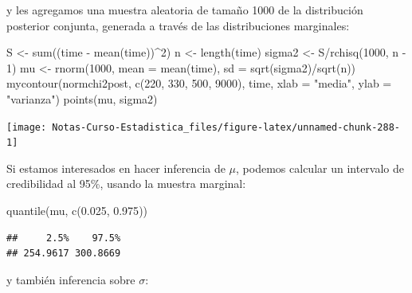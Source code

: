 \documentclass[
  12pt,
]{book}
\newenvironment{Shaded}{\begin{snugshade}}{\end{snugshade}}
\newcommand{\AttributeTok}[1]{\textcolor[rgb]{0.77,0.63,0.00}{#1}}
\newcommand{\DecValTok}[1]{\textcolor[rgb]{0.00,0.00,0.81}{#1}}
\newcommand{\FloatTok}[1]{\textcolor[rgb]{0.00,0.00,0.81}{#1}}
\newcommand{\FunctionTok}[1]{\textcolor[rgb]{0.00,0.00,0.00}{#1}}
\newcommand{\NormalTok}[1]{#1}
\newcommand{\OtherTok}[1]{\textcolor[rgb]{0.56,0.35,0.01}{#1}}
\newcommand{\SpecialCharTok}[1]{\textcolor[rgb]{0.00,0.00,0.00}{#1}}
\newcommand{\StringTok}[1]{\textcolor[rgb]{0.31,0.60,0.02}{#1}}
\begin{document}
y les agregamos una muestra aleatoria de tamaño 1000 de la distribución
posterior conjunta, generada a través de las distribuciones marginales:

\begin{Shaded}
\begin{Highlighting}[]
\NormalTok{S }\OtherTok{\textless{}{-}} \FunctionTok{sum}\NormalTok{((time }\SpecialCharTok{{-}} \FunctionTok{mean}\NormalTok{(time))}\SpecialCharTok{\^{}}\DecValTok{2}\NormalTok{)}
\NormalTok{n }\OtherTok{\textless{}{-}} \FunctionTok{length}\NormalTok{(time)}
\NormalTok{sigma2 }\OtherTok{\textless{}{-}}\NormalTok{ S}\SpecialCharTok{/}\FunctionTok{rchisq}\NormalTok{(}\DecValTok{1000}\NormalTok{, n }\SpecialCharTok{{-}} \DecValTok{1}\NormalTok{)}
\NormalTok{mu }\OtherTok{\textless{}{-}} \FunctionTok{rnorm}\NormalTok{(}\DecValTok{1000}\NormalTok{, }\AttributeTok{mean =} \FunctionTok{mean}\NormalTok{(time), }\AttributeTok{sd =} \FunctionTok{sqrt}\NormalTok{(sigma2)}\SpecialCharTok{/}\FunctionTok{sqrt}\NormalTok{(n))}
\FunctionTok{mycontour}\NormalTok{(normchi2post, }\FunctionTok{c}\NormalTok{(}\DecValTok{220}\NormalTok{, }\DecValTok{330}\NormalTok{, }\DecValTok{500}\NormalTok{, }\DecValTok{9000}\NormalTok{), time,}
    \AttributeTok{xlab =} \StringTok{"media"}\NormalTok{, }\AttributeTok{ylab =} \StringTok{"varianza"}\NormalTok{)}
\FunctionTok{points}\NormalTok{(mu, sigma2)}
\end{Highlighting}
\end{Shaded}

\begin{center}\texttt{[image: Notas-Curso-Estadistica\_files/figure-latex/unnamed-chunk-288-1]} \end{center}

Si estamos interesados en hacer inferencia de \(\mu\), podemos calcular
un intervalo de credibilidad al 95\%, usando la muestra marginal:

\begin{Shaded}
\begin{Highlighting}[]
\FunctionTok{quantile}\NormalTok{(mu, }\FunctionTok{c}\NormalTok{(}\FloatTok{0.025}\NormalTok{, }\FloatTok{0.975}\NormalTok{))}
\end{Highlighting}
\end{Shaded}

\begin{verbatim}
##     2.5%    97.5% 
## 254.9617 300.8669
\end{verbatim}

y también inferencia sobre \(\sigma\):
\end{document}
